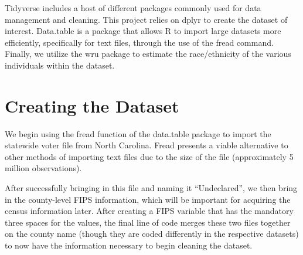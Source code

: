 \documentclass[
]{article}
\newenvironment{Shaded}{}{}
\newcommand{\AttributeTok}[1]{#1}
\newcommand{\DecValTok}[1]{#1}
\newcommand{\FunctionTok}[1]{#1}
\newcommand{\NormalTok}[1]{#1}
\newcommand{\OtherTok}[1]{\textcolor[rgb]{1.00,0.25,0.00}{#1}}
\newcommand{\SpecialCharTok}[1]{\textcolor[rgb]{0.00,0.50,0.50}{#1}}
\newcommand{\StringTok}[1]{\textcolor[rgb]{0.00,0.50,0.50}{#1}}
\begin{document}
Tidyverse includes a host of different packages commonly used for data
management and cleaning. This project relies on dplyr to create the
dataset of interest. Data.table is a package that allows R to import
large datasets more efficiently, specifically for text files, through
the use of the fread command. Finally, we utilize the wru package to
estimate the race/ethnicity of the various individuals within the
dataset.

\hypertarget{creating-the-dataset}{%
\section{Creating the Dataset}\label{creating-the-dataset}}

We begin using the fread function of the data.table package to import
the statewide voter file from North Carolina. Fread presents a viable
alternative to other methods of importing text files due to the size of
the file (approximately 5 million observations).

\begin{Shaded}
\end{Shaded}

After successfully bringing in this file and naming it ``Undeclared'',
we then bring in the county-level FIPS information, which will be
important for acquiring the census information later. After creating a
FIPS variable that has the mandatory three spaces for the values, the
final line of code merges these two files together on the county name
(though they are coded differently in the respective datasets) to now
have the information necessary to begin cleaning the dataset.
\end{document}
